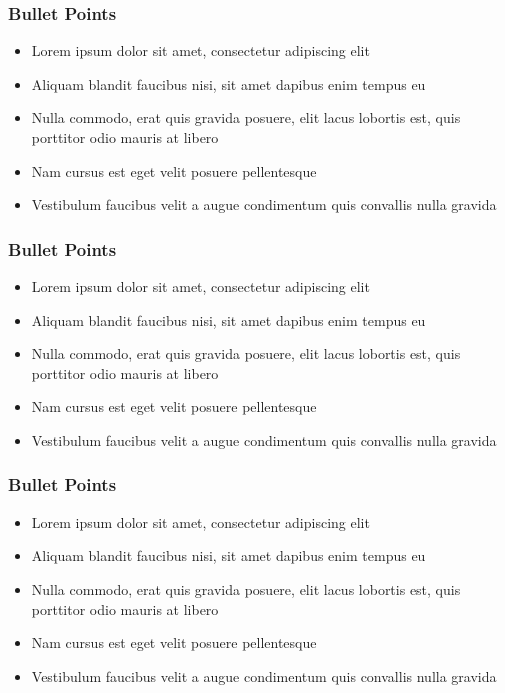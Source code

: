 % 
\begin{frame}
	\frametitle{Bullet Points}
	\begin{itemize}
	\item Lorem ipsum dolor sit amet, consectetur adipiscing elit
	\item Aliquam blandit faucibus nisi, sit amet dapibus enim tempus eu
	\item Nulla commodo, erat quis gravida posuere, elit lacus lobortis est, quis porttitor odio mauris at libero
	\item Nam cursus est eget velit posuere pellentesque
	\item Vestibulum faucibus velit a augue condimentum quis convallis nulla gravida
	\end{itemize}
\end{frame}
% 
% 
% 
% 
\begin{frame}
	\frametitle{Bullet Points}
	\begin{itemize}
	\item Lorem ipsum dolor sit amet, consectetur adipiscing elit
	\item Aliquam blandit faucibus nisi, sit amet dapibus enim tempus eu
	\item Nulla commodo, erat quis gravida posuere, elit lacus lobortis est, quis porttitor odio mauris at libero
	\item Nam cursus est eget velit posuere pellentesque
	\item Vestibulum faucibus velit a augue condimentum quis convallis nulla gravida
	\end{itemize}
\end{frame}
% 
% 
\begin{frame}
	\frametitle{Bullet Points}
	\begin{itemize}
	\item Lorem ipsum dolor sit amet, consectetur adipiscing elit
	\item Aliquam blandit faucibus nisi, sit amet dapibus enim tempus eu
	\item Nulla commodo, erat quis gravida posuere, elit lacus lobortis est, quis porttitor odio mauris at libero
	\item Nam cursus est eget velit posuere pellentesque
	\item Vestibulum faucibus velit a augue condimentum quis convallis nulla gravida
	\end{itemize}
\end{frame}
